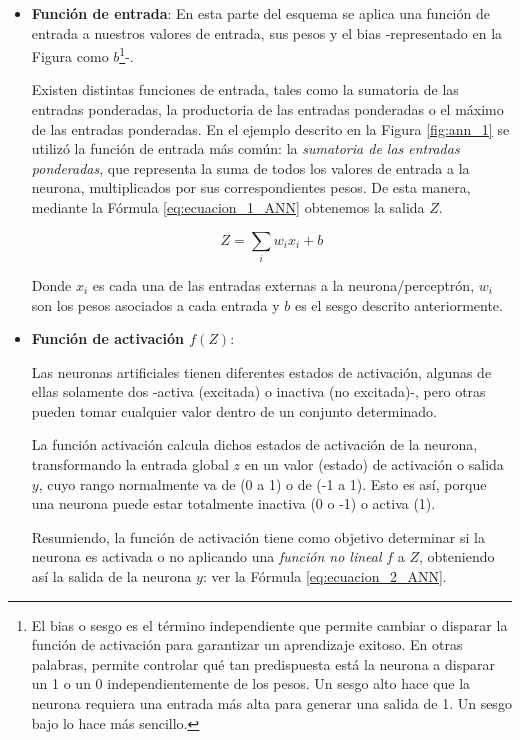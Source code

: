 \documentclass[12pt,a4paper]{article}
\begin{document}
\begin{sloppypar}
\begin{itemize}
\item \textbf{Función de entrada}: En esta parte del esquema se aplica una función de entrada a nuestros valores de entrada, sus pesos y el bias -representado en la Figura como $b$\footnote{El bias o sesgo es el término independiente que permite cambiar o disparar la función de activación para garantizar un aprendizaje exitoso. En otras palabras, permite controlar qué tan predispuesta está la neurona a disparar un 1 o un 0 independientemente de los pesos. Un sesgo alto hace que la neurona requiera una entrada más alta para generar una salida de 1. Un sesgo bajo lo hace más sencillo.}-.

Existen distintas funciones de entrada, tales como la sumatoria de las entradas ponderadas, la productoria de las entradas ponderadas o el máximo de las entradas ponderadas\cite{ANN_23}. En el ejemplo descrito en la Figura \ref{fig:ann_1} se utilizó la función de entrada más común: la \textit{sumatoria de las entradas ponderadas}, que representa la suma de todos los valores de entrada a la neurona, multiplicados por sus correspondientes pesos. De esta manera, mediante la Fórmula \ref{eq:ecuacion_1_ANN} obtenemos la salida $Z$.

\begin{equation}\label{eq:ecuacion_1_ANN}
Z=\sum_{i}w_{i}x_{i}+b
\end{equation}

Donde $x_i$ es cada una de las entradas externas a la neurona/perceptrón, $w_i$ son los pesos asociados a cada entrada y $b$ es el sesgo descrito anteriormente. 

\item \textbf{Función de activación $f(Z)$}:

Las neuronas artificiales tienen diferentes estados de activación, algunas de ellas solamente dos -activa (excitada) o inactiva (no excitada)-, pero otras pueden tomar cualquier valor dentro de un conjunto determinado.

La función activación calcula dichos estados de activación de la neurona, transformando la entrada global $z$ en un valor (estado) de activación o salida $y$, cuyo rango normalmente va de (0 a 1) o de (-1 a 1). Esto es así, porque una neurona puede estar totalmente inactiva (0 o -1) o activa (1)\cite{ANN_23}. 

Resumiendo, la función de activación tiene como objetivo determinar si la neurona es activada o no aplicando una \textit{función no lineal} $f$ a $Z$, obteniendo así la salida de la neurona $y$: ver la Fórmula \ref{eq:ecuacion_2_ANN}. 


\end{itemize}
\end{sloppypar}
\end{document}
